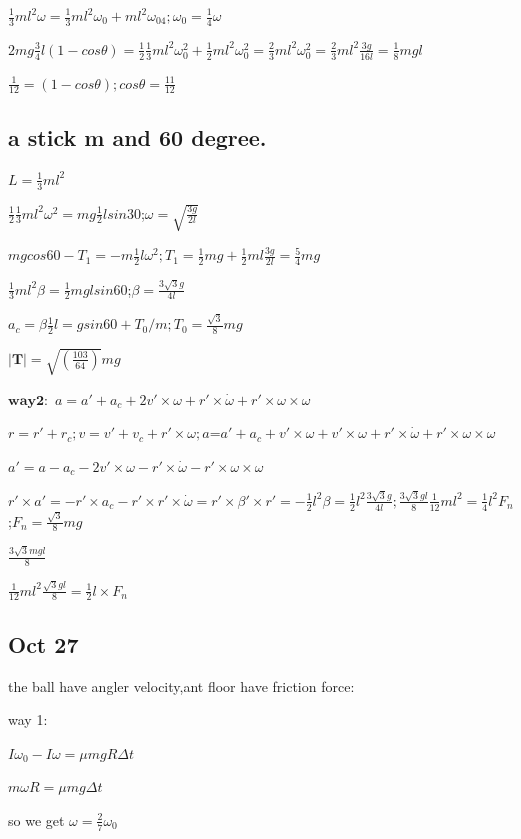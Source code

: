 \documentclass{article}
\begin{document}
$\frac13ml^2\omega=\frac13ml^2\omega_0+ml^2\omega_04;\omega_0=\frac14\omega$

$2mg\frac34l(1-cos\theta)=\frac12\frac13ml^2\omega_0^2+\frac12ml^2\omega_0^2=\frac23ml^2\omega_0^2=\frac23ml^2\frac{3g}{16l}=\frac18mgl$

$\frac1{12}=(1-cos\theta);cos\theta=\frac{11}{12}$

\subsection{a stick m and 60 degree.}

$L=\frac13ml^2$

$\frac12\frac13ml^2\omega^2=mg\frac12lsin30$;$\omega=\sqrt{\frac{3g}{2l}}$

$mgcos60-T_1=-m\frac12l\omega^2;T_1=\frac12mg+\frac12ml\frac{3g}{2l}=\frac54mg$

$\frac13ml^2\beta=\frac12mglsin60$;$\beta=\frac{3\sqrt3 g}{4l}$

$a_c=\beta\frac12l=gsin60+T_0/m;T_0=\frac{\sqrt3}{8}mg$

$ |\bm{T}|=\sqrt{(\frac{103}{64})}mg$

$\bm{way2:}
$
$a=a'+a_c+2v'\times\omega+r'\times\dot\omega+r'\times\omega\times\omega$

$r=r'+r_c;v=v'+v_c+r'\times\omega;a$=$a'+a_c+v'\times\omega+v'\times\omega+r'\times\dot\omega+r'\times\omega\times\omega$

$a'=a-a_c-2v'\times\omega-r'\times\dot\omega-r'\times\omega\times\omega$


$r'\times a'=-r'\times a_c-r'\times r'\times\dot\omega=r'\times\beta'\times r'=-\frac12l^2\beta=\frac12l^2\frac{3\sqrt3 g}{4l};\frac{3\sqrt3 gl}{8}\frac1{12}ml^2=\frac14l^2F_n$;$F_n=\frac{\sqrt3}{8}mg$

$\frac{3\sqrt3 mgl}{8}$

$\frac{1}{12}ml^2\frac{\sqrt3 gl}{8}=\frac12l\times F_n$

\subsection{Oct 27}

the ball have angler velocity,ant floor have friction force:

way 1:

$I\omega_0-I\omega=\mu mgR\Delta t$

$m\omega R=\mu mg\Delta t$

so we get $\omega=\frac27\omega_0$
\end{document}
